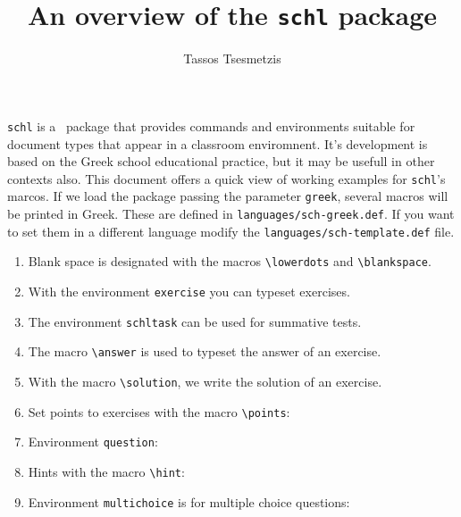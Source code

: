 \documentclass[10pt,a4page]{article}
\author{Tassos Tsesmetzis}
\title{An overview of the \texttt{schl} package}
\date{}
\def\cellwidth{0.4\textwidth}
\newcommand{\miniexample}[2][c]{%
  \parbox[#1]{\cellwidth}{#2}
}
\newcommand{\codeexample}[2][c]{%
  \miniexample[#1]{}
}
\newcommand{\textexample}[2][c]{%
  \small
  \colorbox[gray]{0.9}{\miniexample[#1]{}}
}
\newcommand{\examplerow}[2][10pt]{%
  \par\noindent\phantom{}\hfill\codeexample{#2}\hspace{#1}\textexample{#2}\hfill\phantom{}
}
\begin{document}
\maketitle

\verb|schl| is a \XeLaTeX\, package that provides commands and environments suitable for document types that appear in a classroom enviromnent. It's development is based on the Greek school educational practice, but it may be usefull in other contexts also. This document offers a quick view of working examples for \verb|schl|'s marcos. If we load the package passing the parameter \verb|greek|, several macros will be printed in Greek. These are
defined in \verb|languages/sch-greek.def|. If you want to set them in a different language modify the \verb|languages/sch-template.def| file.

\begin{enumerate}
\item Blank space is designated with the macros \verb|\lowerdots| and \verb|\blankspace|.
  \examplerow{exampleBlankspace01.tex}
  \examplerow{exampleBlankspace02.tex}
  \examplerow{exampleBlankspace03.tex}
  \examplerow{exampleBlankspace04.tex}

\item With the environment \texttt{exercise} you can typeset exercises.
  \examplerow{exampleEnvirExercise.tex}
\item The environment \texttt{schltask} can be used for summative tests.
  \examplerow{exampleEnvirSchltask.tex}
\item The macro \verb/\answer/ is used to typeset the answer of an exercise.
  \examplerow{exampleMacroAnswer.tex}
\item With the macro \verb|\solution|, we write the solution of an exercise.
  \examplerow{exampleMacroSolution.tex}
\item Set points to exercises with the macro \verb|\points|:
  \examplerow{exampleMacroPoints.tex}
\item Environment \verb|question|:
  \examplerow{exampleEnvirQuestion.tex}
\item Hints with the macro \verb|\hint|:
  \examplerow{exampleMacroHint.tex}
\item Environment \verb|multichoice| is for multiple choice questions:
  \examplerow{exampleEnvirMultichoice01.tex}


\end{enumerate}
\end{document}
